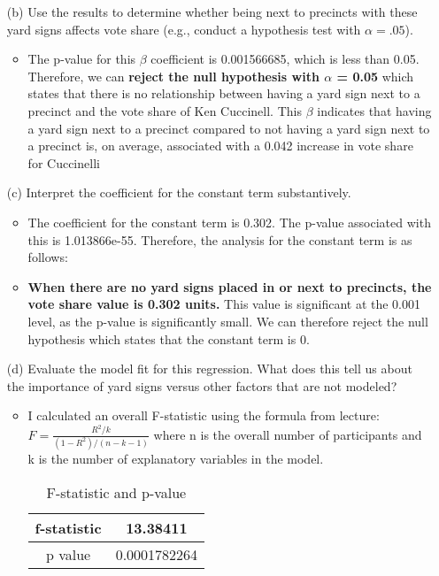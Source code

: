\documentclass[12pt,letterpaper]{article}
\begin{document}
\begin{enumerate}
\begin{itemize}
	
\end{itemize}

			
	\item [(b)]  Use the results to determine whether being
	next to precincts with these yard signs affects vote
	share (e.g., conduct a hypothesis test with $\alpha = .05$).
	
	
\begin{itemize}
	\item The p-value for this $\beta$ coefficient is 0.001566685, which is less than 0.05. Therefore, we can \textbf{reject the null hypothesis with $\alpha$ = 0.05} which states that there is no relationship between having a yard sign next to a precinct and the vote share of Ken Cuccinell. This $\beta$ indicates that having a yard sign next to a precinct compared to not having a yard sign next to a precinct is, on average, associated with a 0.042 increase in vote share for Cuccinelli
	
\end{itemize}


	\item [(c)] Interpret the coefficient for the constant term substantively.
	
\begin{itemize}
	\item The coefficient for the constant term is 0.302. The  p-value associated with this is 1.013866e-55. Therefore, the analysis for the constant term is as follows:
	\item \textbf{When there are no yard signs placed in or next to precincts, the vote share value is 0.302 units.} This value is significant at the 0.001 level, as the p-value is significantly small. We can therefore reject the null hypothesis which states that the constant term is 0.
\end{itemize}
	\vspace{7cm}
	
	\item [(d)] Evaluate the model fit for this regression.  What does this	tell us about the importance of yard signs versus other factors that are not modeled?
	
	
\begin{itemize}
	\item I calculated an overall F-statistic using the formula from lecture:
	\large $ F = \frac{R^2 / k}{(1 - R^2) / (n - k - 1)}$
	\newline \normalsize where n is the overall number of participants and k is the number of explanatory variables in the model.
	\newline 
	
	\begin{table}[h]
		\centering
		\begin{tabular}{|c|c|}
			\hline
			f-statistic & 13.38411 \\
			\hline
			p value & 0.0001782264 \\
			\hline
		\end{tabular}
		\caption{F-statistic and p-value}
	\end{table}
	

\end{itemize}
\end{enumerate}
\end{document}
